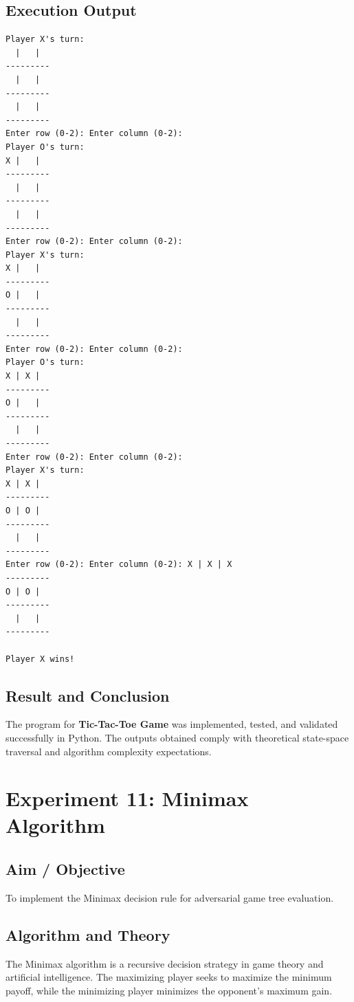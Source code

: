 \documentclass[11pt,a4paper]{report}
\begin{document}
\section{Execution Output}
\begin{tcolorbox}[colback=outputback,colframe=outputframe,title={\textbf{Terminal Output - Tic-Tac-Toe Game}}]
\begin{verbatim}
Player X's turn:
  |   |  
---------
  |   |  
---------
  |   |  
---------
Enter row (0-2): Enter column (0-2): 
Player O's turn:
X |   |  
---------
  |   |  
---------
  |   |  
---------
Enter row (0-2): Enter column (0-2): 
Player X's turn:
X |   |  
---------
O |   |  
---------
  |   |  
---------
Enter row (0-2): Enter column (0-2): 
Player O's turn:
X | X |  
---------
O |   |  
---------
  |   |  
---------
Enter row (0-2): Enter column (0-2): 
Player X's turn:
X | X |  
---------
O | O |  
---------
  |   |  
---------
Enter row (0-2): Enter column (0-2): X | X | X
---------
O | O |  
---------
  |   |  
---------

Player X wins!
\end{verbatim}
\end{tcolorbox}

\section{Result and Conclusion}
The program for \textbf{Tic-Tac-Toe Game} was implemented, tested, and validated successfully in Python. The outputs obtained comply with theoretical state-space traversal and algorithm complexity expectations.

\newpage

\chapter{Experiment 11: Minimax Algorithm}

\section{Aim / Objective}
To implement the Minimax decision rule for adversarial game tree evaluation.

\section{Algorithm and Theory}
The Minimax algorithm is a recursive decision strategy in game theory and artificial intelligence. The maximizing player seeks to maximize the minimum payoff, while the minimizing player minimizes the opponent's maximum gain.
\end{document}
